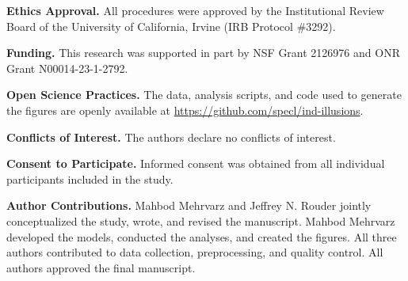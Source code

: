 \textbf{Ethics Approval.} All procedures were approved by the Institutional Review Board of the University of California, Irvine (IRB Protocol \#3292).

\textbf{Funding.} This research was supported in part by NSF Grant 2126976 and ONR Grant N00014-23-1-2792.

\textbf{Open Science Practices.} The data, analysis scripts, and code used to generate the figures are openly available at \url{https://github.com/specl/ind-illusions}.

\textbf{Conflicts of Interest.} The authors declare no conflicts of interest.

\textbf{Consent to Participate.} Informed consent was obtained from all individual participants included in the study.

\textbf{Author Contributions.} Mahbod Mehrvarz and Jeffrey N. Rouder jointly conceptualized the study, wrote, and revised the manuscript. Mahbod Mehrvarz developed the models, conducted the analyses, and created the figures. All three authors contributed to data collection, preprocessing, and quality control. All authors approved the final manuscript.
